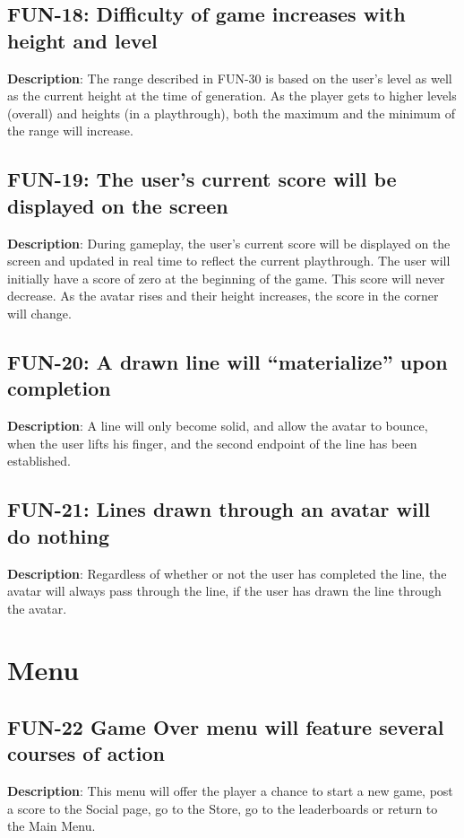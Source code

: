 \subsection{FUN-18: Difficulty of game increases with height and level}
\textbf{Description}: The range described in FUN-30 is based on the
user\textquoteright{}s level as well as the current height at the
time of generation. As the player gets to higher levels (overall)
and heights (in a playthrough), both the maximum and the minimum of
the range will increase.

\subsection{FUN-19: The user\textquoteright{}s current score will be displayed
on the screen}
\textbf{Description}: During gameplay, the user\textquoteright{}s
current score will be displayed on the screen and updated in real
time to reflect the current playthrough. The user will initially have
a score of zero at the beginning of the game. This score will never
decrease. As the avatar rises and their height increases, the score
in the corner will change. 

\subsection{FUN-20: A drawn line will \textquotedblleft{}materialize\textquotedblright{}
upon completion}
\textbf{Description}: A line will only become solid, and allow the
avatar to bounce, when the user lifts his finger, and the second endpoint
of the line has been established.

\subsection{FUN-21: Lines drawn through an avatar will do nothing}
\textbf{Description}: Regardless of whether or not the user has completed
the line, the avatar will always pass through the line, if the user
has drawn the line through the avatar.

\section{Menu}

\subsection{FUN-22 Game Over menu will feature several courses of action}
\textbf{Description}: This menu will offer the player a chance to
start a new game, post a score to the Social page, go to the Store,
go to the leaderboards or return to the Main Menu.

